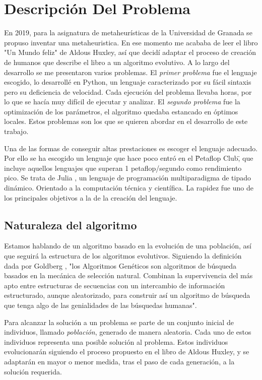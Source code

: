\chapter{Descripción Del Problema}

En 2019, para la asignatura de metaheurísticas de la Universidad de Granada \cite{merelo_molina_2021} se propuso inventar una metaheuristica. En
ese momento me acababa de leer el libro "Un Mundo feliz" de Aldous Huxley, así que decidí adaptar el proceso de creación 
de humanos que describe el libro a un algoritmo evolutivo. A lo largo del desarrollo se me presentaron varios problemas. El
\textit{primer problema} fue el lenguaje escogido, lo desarrollé en Python, un lenguaje caracterizado por su fácil sintaxis pero su deficiencia de
velocidad. Cada ejecución del problema llevaba horas, por lo que se hacía muy difícil de ejecutar y analizar. El
\textit{segundo problema} fue la optimización de los parámetros, el algoritmo quedaba estancado en óptimos locales. Estos problemas son 
los que se quieren abordar en el desarrollo de este trabajo.

Una de las formas de conseguir altas prestaciones es escoger el lenguaje adecuado. Por ello se ha escogido un lenguaje que
hace poco entró en el \"Petaflop Club\", que incluye aquellos lenguajes que superan 1 petaflop/segundo como rendimiento pico. Se trata
de Julia \cite{julia}, un lenguaje de programación multiparadigma de tipado dinámico. Orientado a la computación técnica y 
científica. La rapidez fue uno de los principales objetivos a la de la creación del lenguaje. 

\section{Naturaleza del algoritmo}

Estamos hablando de un algoritmo basado en la evolución de una población, así que seguirá la estructura de los
algoritmos evolutivos. Siguiendo la definición dada por Goldberg \cite{goldberg89}, "los Algoritmos Genéticos son algoritmos de búsqueda
basados en la mecánica de selección natural. Combinan la supervivencia del más apto entre estructuras de secuencias con un intercambio de 
información estructurado, aunque aleatorizado, para construir así un algoritmo
de búsqueda que tenga algo de las genialidades de las búsquedas humanas".

Para alcanzar la solución a un problema se parte de un conjunto inicial de individuos, llamado \textit{población},
generado de manera aleatoria. Cada uno de estos individuos representa una posible solución al problema. Estos individuos
evolucionarán siguiendo el proceso propuesto en el libro de Aldous Huxley, y se adaptarán en mayor o menor medida,
tras el paso de cada generación, a la solución requerida.
